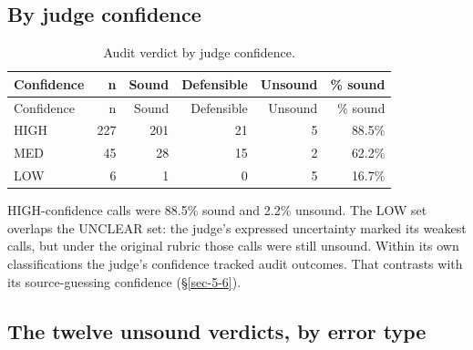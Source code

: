 \documentclass[11pt]{article}
\newcommand{\tableneed}[1]{\par\penalty0\ifdim\dimexpr\pagegoal-\pagetotal\relax<#1\relax\newpage\fi}
\begin{document}
\tableneed{11\baselineskip}
\hypertarget{sec-6-3}{%
\subsection{By judge confidence}\label{sec-6-3}}

{\small\setlength{\tabcolsep}{4pt}
\begin{longtable}[]{@{}lrrrrr@{}}
\caption{Audit verdict by judge confidence. \label{tbl-14}}\tabularnewline
\toprule\noalign{}
Confidence & n & Sound & Defensible & Unsound & \% sound \\
\midrule\noalign{}
\endfirsthead
\toprule\noalign{}
Confidence & n & Sound & Defensible & Unsound & \% sound \\
\midrule\noalign{}
\endhead
\bottomrule\noalign{}
\endlastfoot
HIGH & 227 & 201 & 21 & 5 & 88.5\% \\
MED & 45 & 28 & 15 & 2 & 62.2\% \\
LOW & 6 & 1 & 0 & 5 & 16.7\% \\
\end{longtable}
}

HIGH-confidence calls were 88.5\% sound and 2.2\% unsound. The LOW set overlaps the UNCLEAR set: the judge's expressed uncertainty marked its weakest calls, but under the original rubric those calls were still unsound. Within its own classifications the judge's confidence tracked audit outcomes. That contrasts with its source-guessing confidence (§\ref{sec-5-6}).

\tableneed{23\baselineskip}
\hypertarget{sec-6-4}{%
\subsection{The twelve unsound verdicts, by error type}\label{sec-6-4}}
\end{document}
